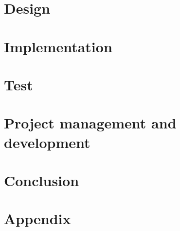 \newpage
\section{Design}
\label{sec:design}








\newpage
\section{Implementation}






\newpage
\section{Test}






\section{Project management and development}
\label{sec:projectmanagement}



\newpage



\newpage
\section{Conclusion}





\newpage


\newpage
\section{Appendix}
%






